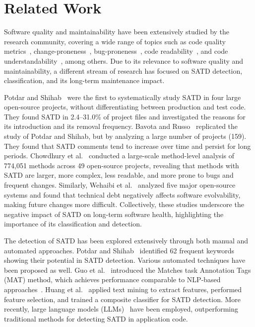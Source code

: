 \section{Related Work}\label{sec:related_work}
Software quality and maintainability have been extensively studied by the research community, covering a wide range of topics such as code quality metrics~\cite{mccabe_complexity_1976, chidamber_metrics_1994, mo_decoupling_2016}, change-proneness~\cite{chowdhury_revisiting_2022, khomh_exploratory_2012, romano_using_2011}, bug-proneness~\cite{chowdhury_method-level_2024, pascarella_performance_2020, giger_method-level_2012}, code readability~\cite{posnett_simpler_2011, buse_learning_2010}, and code understandability~\cite{scalabrino_automatically_2017}, among others. Due to its relevance to software quality and maintainability, a different stream of research has focused on SATD detection, classification, and its long-term maintenance impact.

Potdar and Shihab~\cite{potdar_exploratory_2014} were the first to systematically study SATD in four large open-source projects, without differentiating between production and test code. They found SATD in 2.4–31.0\% of project files and investigated the reasons for its introduction and its removal frequency. Bavota and Russo~\cite{bavota_large-scale_2016} replicated the study of Potdar and Shihab, but by analyzing a large number of projects (159). They found that SATD comments tend to increase over time and persist for long periods. Chowdhury et al.~\cite{chowdhury_evidence_2025} conducted a large-scale method-level analysis of 774,051 methods across 49 open-source projects, revealing that methods with SATD are larger, more complex, less readable, and more prone to bugs and frequent changes. Similarly, Wehaibi et al.~\cite{wehaibi_examining_2016} analyzed five major open-source systems and found that technical debt negatively affects software evolvability, making future changes more difficult. Collectively, these studies underscore the negative impact of SATD on long-term software health, highlighting the importance of its classification and detection.

The detection of SATD has been explored extensively through both manual and automated approaches. Potdar and Shihab~\cite{potdar_exploratory_2014} identified 62 frequent keywords showing their potential in SATD detection. Various automated techniques have been proposed as well. Guo et al.~\cite{guo_how_2021} introduced the Matches task Annotation Tags (MAT) method, which achieves performance comparable to NLP-based approaches~\cite{maldonado_using_2017}. Huang et al.~\cite{huang_identifying_2018} applied text mining to extract features, performed feature selection, and trained a composite classifier for SATD detection. More recently, large language models (LLMs)~\cite{sheikhaei_empirical_2024, lambert_identification_2024,gu_self-admitted_2024} have been employed, outperforming traditional methods for detecting SATD in application code.

